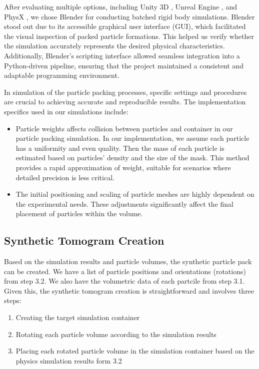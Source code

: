 \documentclass[preprint,12pt]{elsarticle}
\begin{document}
\par
After evaluating multiple options, including Unity 3D \citep{unity2024unity}, Unreal Engine \citep{unreal2024epic}, and PhysX \citep{nvidia2024nvidia}, we chose Blender \citep{blender2023objectops} for conducting batched rigid body simulations. 
Blender stood out due to its accessible graphical user interface (GUI), which facilitated the visual inspection of packed particle formations. 
This helped us verify whether the simulation accurately represents the desired physical characteristics.
Additionally, Blender's scripting interface allowed seamless integration into a Python-driven pipeline, ensuring that the project maintained a consistent and adaptable programming environment.
\par
In simulation of the particle packing processes, specific settings and procedures are crucial to achieving accurate and reproducible results. 
The implementation specifics used in our simulations include:
\begin{itemize}
    \item
    Particle weights affects collision between particles and container in our particle packing simulation. 
    In our implementation, we assume each particle has a uniformity and even quality. 
    Then the mass of each particle is estimated based on particles' density and the size of the mask.
    This method provides a rapid approximation of weight, suitable for scenarios where detailed precision is less critical. 
    \item
    The initial positioning and scaling of particle meshes are highly dependent on the experimental needs. 
    These adjustments significantly affect the final placement of particles within the volume. 
\end{itemize}
\subsection{Synthetic Tomogram Creation}
Based on the simulation results and particle volumes, the synthetic particle pack can be created. 
We have a list of particle positions and orientations (rotations) from step 3.2.
We also have the volumetric data of each partcile from step 3.1. 
Given this, the synthetic tomogram creation is straightforward and involves three steps:
\begin{enumerate}
    \item Creating the target simulation container
    \item Rotating each particle volume according to the simulation results
    \item Placing each rotated particle volume in the simulation container based on the physics simulation results form 3.2
\end{enumerate}
\end{document}
